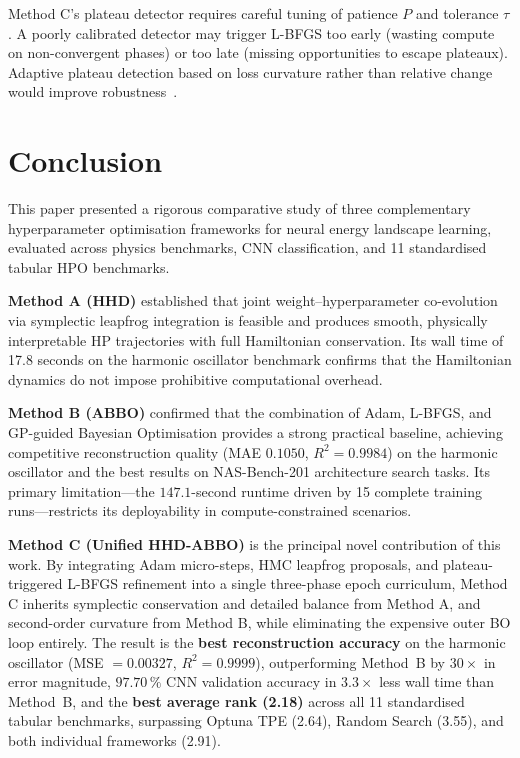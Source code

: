 \documentclass[12pt,a4paper]{article}
\begin{document}
Method C's plateau detector requires careful tuning of patience $P$
and tolerance $\tau$.  A poorly calibrated detector may trigger L-BFGS
too early (wasting compute on non-convergent phases) or too late
(missing opportunities to escape plateaux).  Adaptive plateau
detection based on loss curvature rather than relative change would
improve robustness~\cite{rathore2024}.


\section{Conclusion}

This paper presented a rigorous comparative study of three complementary
hyperparameter optimisation frameworks for neural energy landscape
learning, evaluated across physics benchmarks, CNN classification,
and 11 standardised tabular HPO benchmarks.

\textbf{Method A (HHD)} established that joint weight--hyperparameter
co-evolution via symplectic leapfrog integration is feasible and
produces smooth, physically interpretable HP trajectories with full
Hamiltonian conservation.  Its wall time of 17.8 seconds on the harmonic
oscillator benchmark confirms that the Hamiltonian dynamics do not
impose prohibitive computational overhead.

\textbf{Method B (ABBO)} confirmed that the combination of Adam,
L-BFGS, and GP-guided Bayesian Optimisation provides a strong practical
baseline, achieving competitive reconstruction quality (MAE $0.1050$,
$R^2 = 0.9984$) on the harmonic oscillator and the best results on
NAS-Bench-201 architecture search tasks.  Its primary limitation---the
$147.1$-second runtime driven by 15 complete training runs---restricts
its deployability in compute-constrained scenarios.

\textbf{Method C (Unified HHD-ABBO)} is the principal novel contribution
of this work.  By integrating Adam micro-steps, HMC leapfrog proposals,
and plateau-triggered L-BFGS refinement into a single three-phase
epoch curriculum, Method C inherits symplectic conservation and detailed
balance from Method A, and second-order curvature from Method B, while
eliminating the expensive outer BO loop entirely.  The result is the
\textbf{best reconstruction accuracy} on the harmonic oscillator
(MSE $= 0.00327$, $R^2 = 0.9999$), outperforming Method~B by
$30\times$ in error magnitude, $97.70\,\%$ CNN validation accuracy
in $3.3\times$ less wall time than Method~B, and the \textbf{best
average rank (2.18)} across all 11 standardised tabular benchmarks,
surpassing Optuna TPE (2.64), Random Search (3.55), and both individual
frameworks (2.91).
\end{document}
